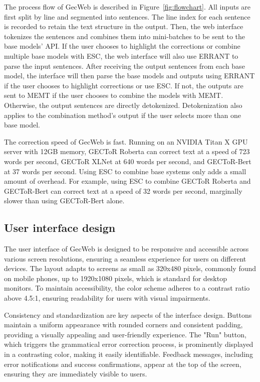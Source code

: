 The process flow of GecWeb is described in Figure~\ref{fig:flowchart}.
All inputs are first split by line and segmented into sentences.
The line index for each sentence is recorded to retain the text structure in the output.
Then, the web interface tokenizes the sentences and combines them into mini-batches to be sent to the base models' API.
If the user chooses to highlight the corrections or combine multiple
base models with ESC, the web interface will also use ERRANT to parse the input sentences.
After receiving the output sentences from each base model, the interface will then parse the base models and outputs using ERRANT if the user chooses to highlight corrections or use ESC.
If not, the outputs are sent to MEMT if the user chooses to combine the models with MEMT.
Otherwise, the output sentences are directly detokenized.
Detokenization also applies to the combination method's output if the user selects more than one base model.

The correction speed of GecWeb is fast.
Running on an NVIDIA Titan X GPU server with 12GB memory, GECToR Roberta can correct text at a speed of 723 words per second, GECToR XLNet at 640 words per second, and GECToR-Bert at 37 words per second.
Using ESC to combine base systems only adds a small amount of overhead.
For example, using ESC to combine GECToR Roberta and GECToR-Bert can correct text at a speed of 32 words per second, marginally slower than using GECToR-Bert alone.

\subsection{User interface design}

The user interface of GecWeb is designed to be responsive and accessible across various screen resolutions, ensuring a seamless experience for users on different devices.
The layout adapts to screens as small as 320x480 pixels, commonly found on mobile phones, up to 1920x1080 pixels, which is standard for desktop monitors.
To maintain accessibility, the color scheme adheres to a contrast ratio above 4.5:1, ensuring readability for users with visual impairments.

Consistency and standardization are key aspects of the interface design.
Buttons maintain a uniform appearance with rounded corners and consistent padding, providing a visually appealing and user-friendly experience.
The "Run" button, which triggers the grammatical error correction process, is prominently displayed in a contrasting color, making it easily identifiable.
Feedback messages, including error notifications and success confirmations, appear at the top of the screen, ensuring they are immediately visible to users.

